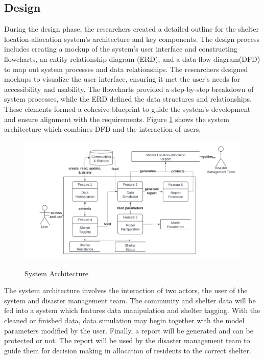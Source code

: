 \subsection{Design}
	During the design phase, the researchers created a detailed outline for the shelter location-allocation system's architecture and key components. The design process includes creating a mockup of the system's user interface and constructing flowcharts, an entity-relationship diagram (ERD), and a data flow diagram(DFD) to map out system processes and data relationships. The researchers designed mockups to visualize the user interface, ensuring it met the user's needs for accessibility and usability. The flowcharts provided a step-by-step breakdown of system processes, while the ERD defined the data structures and relationships. These elements formed a cohesive blueprint to guide the system's development and ensure alignment with the requirements. Figure \ref{SystemArch} shows the system architecture which combines DFD and the interaction of users.

	\begin{figure}[h!]
		\caption{System Architecture}
		\centering
		\includegraphics[width=\textwidth]{Context Diagram}
		\label{SystemArch}
	\end{figure}
	
	The system architecture involves the interaction of two actors, the user of the system and disaster management team. The community and shelter data will be fed into a system which features data manipulation and shelter tagging. With the cleaned or finished data, data simulation may begin together with the model parameters modified by the user. Finally, a report will be generated and can be protected or not. The report will be used by the disaster management team to guide them for decision making in allocation of residents to the correct shelter.

